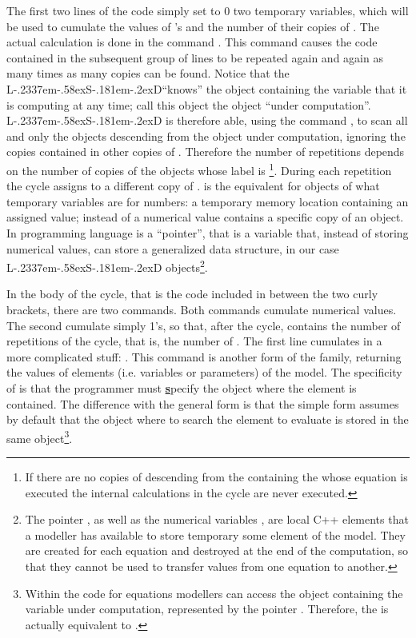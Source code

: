 \documentclass [11pt,a4paper] {book}
\def\LsD{{L\kern-.2337em\lower-.58ex\hbox{S}\kern-.181em\lower-.2ex\hbox{D}}\xspace}
\begin{document}
The first two lines of the code simply set to 0 two temporary variables, which will be
used to cumulate the values of 's and the number of their copies of
. The actual calculation is done in the command
. This command causes the code contained in the
subsequent group of lines to be repeated again and again as many times as many copies 
 can be found. Notice that the \LsD ``knows'' the object containing the variable that it is computing at any time; call this object the object ``under computation''. \LsD is therefore able, using the command , to scan all and only the objects descending from the object under computation, ignoring the copies contained in other copies of . Therefore the number of repetitions depends on the number of copies of the
objects whose label is \footnote{If there are no copies of 
descending from the  containing the  whose equation
is executed the internal calculations in the cycle are never executed.}. During each
repetition the cycle assigns to  a different copy of .  is
the equivalent for objects of what temporary variables are for numbers: a temporary
memory location containing an assigned value; instead of a numerical value  contains a specific copy of an object. In programming language  is a ``pointer'', that
is a variable that, instead of storing numerical values, can store a generalized data structure, in our case \LsD
objects\footnote{The pointer , as well as the numerical variables ,
are local C++ elements that a modeller has available to store temporary some element of
the model. They are created for each equation and destroyed at the end of the
computation, so that they cannot be used to transfer values from one equation to another.
}.

In the body of the cycle, that is the code included in between the two curly brackets,
there are two commands. Both commands cumulate numerical values. The second cumulate
simply 1's, so that, after the cycle,  contains the number of repetitions of
the cycle, that is, the number of . The first line cumulates in  a
more complicated stuff: . This command is another form of the  family, returning the values of elements
(i.e. variables or parameters) of the model. The specificity of  is that
the programmer must \underline{\textbf{s}}pecify the object where the element is contained.
The difference with the general form  is that the simple form assumes by default that the object where to search the element to evaluate is stored in the same object\footnote{Within the code for equations modellers can access the object containing the variable under computation, represented by the pointer . Therefore, the  is actually equivalent to .}. 
\end{document}
